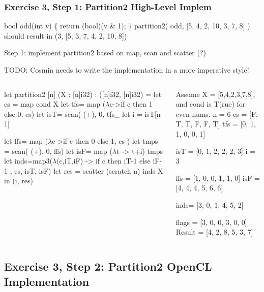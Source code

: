 \documentclass{beamer}
\newcommand{\mymath}[1]{$ #1 $}
\begin{document}
\begin{frame}[fragile,t]
  \frametitle{Exercise 3, Step 1: Partition2 High-Level Implem}

\begin{colorcode}
bool odd(int v) \{ return (bool)(v & 1); \}
partition2( odd, [5, 4, 2, 10, 3, 7, 8] ) should result in
             (3, [5, 3, 7, 4, 2, 10, 8])
\end{colorcode}

Step 1: implement partition2 based on map, scan and scatter (?)\pause

TODO: Cosmin needs to write the implementation in a more imperative style!

\begin{columns}
\begin{colorcode}
let partition2 [n] (X : [n]i32) : 
              ([n]i32, [n]i32) =
 let cs = map cond X
 let tfs= map (\mymath{\lambda}c->if c then 1 
                        else 0,  cs)
 let isT= scan( (+), 0, tfs_
 let i  = isT[n-1]

 let ffs= map (\mymath{\lambda}c->if c then 0 
                        else 1,  cs )
 let tmps = scan( (+), 0, ffs)
 let isF= map (\mymath{\lambda}t -> t+i) tmps
 let inds=map3(\mymath{\lambda}(c,iT,iF) -> 
                  if c then iT-1 
                       else iF-1
              , cs, isT, isF)
 let res = scatter (scratch n) inds X
 in (i, res)
\end{colorcode}
\vspace{-2ex}
\begin{colorcode}[fontsize=\scriptsize]
Assume X = [5,4,2,3,7,8], and 
cond is T(rue) for even nums.\pause
n   = 6
cs  = [F, T, T, F, F, T]
tfs = [0, 1, 1, 0, 0, 1]

isT = [0, 1, 2, 2, 2, 3]
i   = 3

ffs = [1, 0, 0, 1, 1, 0]
isF = [4, 4, 4, 5, 6, 6]

inds= [3, 0, 1, 4, 5, 2]


flags  = [3, 0, 0, 3, 0, 0]
Result = [4, 2, 8, 5, 3, 7] 
\end{colorcode}
\end{columns}


\end{frame}


\subsection{Exercise 3, Step 2: Partition2 OpenCL Implementation}
\end{document}

